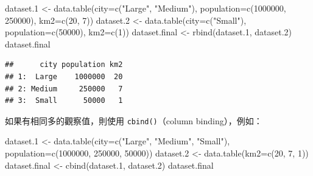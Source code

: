 \documentclass[
]{book}
\newenvironment{Shaded}{\begin{snugshade}}{\end{snugshade}}
\newcommand{\AttributeTok}[1]{\textcolor[rgb]{0.77,0.63,0.00}{#1}}
\newcommand{\DecValTok}[1]{\textcolor[rgb]{0.00,0.00,0.81}{#1}}
\newcommand{\FloatTok}[1]{\textcolor[rgb]{0.00,0.00,0.81}{#1}}
\newcommand{\FunctionTok}[1]{\textcolor[rgb]{0.00,0.00,0.00}{#1}}
\newcommand{\NormalTok}[1]{#1}
\newcommand{\OtherTok}[1]{\textcolor[rgb]{0.56,0.35,0.01}{#1}}
\newcommand{\StringTok}[1]{\textcolor[rgb]{0.31,0.60,0.02}{#1}}
\theoremstyle{definition}
\theoremstyle{remark}
\begin{document}
\begin{Shaded}
\begin{Highlighting}[]
\NormalTok{dataset}\FloatTok{.1} \OtherTok{\textless{}{-}} \FunctionTok{data.table}\NormalTok{(}\AttributeTok{city=}\FunctionTok{c}\NormalTok{(}\StringTok{"Large"}\NormalTok{, }\StringTok{"Medium"}\NormalTok{), }\AttributeTok{population=}\FunctionTok{c}\NormalTok{(}\DecValTok{1000000}\NormalTok{, }\DecValTok{250000}\NormalTok{), }\AttributeTok{km2=}\FunctionTok{c}\NormalTok{(}\DecValTok{20}\NormalTok{, }\DecValTok{7}\NormalTok{))}
\NormalTok{dataset}\FloatTok{.2} \OtherTok{\textless{}{-}} \FunctionTok{data.table}\NormalTok{(}\AttributeTok{city=}\FunctionTok{c}\NormalTok{(}\StringTok{"Small"}\NormalTok{), }\AttributeTok{population=}\FunctionTok{c}\NormalTok{(}\DecValTok{50000}\NormalTok{), }\AttributeTok{km2=}\FunctionTok{c}\NormalTok{(}\DecValTok{1}\NormalTok{))}
\NormalTok{dataset.final }\OtherTok{\textless{}{-}} \FunctionTok{rbind}\NormalTok{(dataset}\FloatTok{.1}\NormalTok{, dataset}\FloatTok{.2}\NormalTok{)}
\NormalTok{dataset.final}
\end{Highlighting}
\end{Shaded}

\begin{verbatim}
##      city population km2
## 1:  Large    1000000  20
## 2: Medium     250000   7
## 3:  Small      50000   1
\end{verbatim}

如果有相同多的觀察值，則使用 \texttt{cbind()}（column binding），例如：

\begin{Shaded}
\begin{Highlighting}[]
\NormalTok{dataset}\FloatTok{.1} \OtherTok{\textless{}{-}} \FunctionTok{data.table}\NormalTok{(}\AttributeTok{city=}\FunctionTok{c}\NormalTok{(}\StringTok{"Large"}\NormalTok{, }\StringTok{"Medium"}\NormalTok{, }\StringTok{"Small"}\NormalTok{), }\AttributeTok{population=}\FunctionTok{c}\NormalTok{(}\DecValTok{1000000}\NormalTok{, }\DecValTok{250000}\NormalTok{, }\DecValTok{50000}\NormalTok{))}
\NormalTok{dataset}\FloatTok{.2} \OtherTok{\textless{}{-}} \FunctionTok{data.table}\NormalTok{(}\AttributeTok{km2=}\FunctionTok{c}\NormalTok{(}\DecValTok{20}\NormalTok{, }\DecValTok{7}\NormalTok{, }\DecValTok{1}\NormalTok{))}
\NormalTok{dataset.final }\OtherTok{\textless{}{-}} \FunctionTok{cbind}\NormalTok{(dataset}\FloatTok{.1}\NormalTok{, dataset}\FloatTok{.2}\NormalTok{)}
\NormalTok{dataset.final}
\end{Highlighting}
\end{Shaded}
\end{document}
